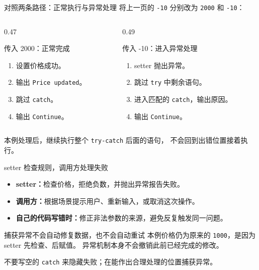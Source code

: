 \documentclass[aspectratio=169]{beamer}
\begin{document}
\begin{frame}{对照两条路径：正常执行与异常处理}
  将上一页的 \texttt{-10} 分别改为 \texttt{2000} 和 \texttt{-10}：
  \par\bigskip
  \begin{columns}[T,onlytextwidth]
    \begin{column}{0.47\textwidth}
      \begin{block}{传入 2000：正常完成}
        \begin{enumerate}
          \item 设置价格成功。
          \item 输出 \texttt{Price updated}。
          \item 跳过 \texttt{catch}。
          \item 输出 \texttt{Continue}。
        \end{enumerate}
      \end{block}
    \end{column}
    \begin{column}{0.49\textwidth}
      \begin{block}{传入 -10：进入异常处理}
        \begin{enumerate}
          \item setter 抛出异常。
          \item 跳过 \texttt{try} 中剩余语句。
          \item 进入匹配的 \texttt{catch}，输出原因。
          \item 输出 \texttt{Continue}。
        \end{enumerate}
      \end{block}
    \end{column}
  \end{columns}
  \bigskip
  本例处理后，继续执行整个 \texttt{try-catch} 后面的语句，
  \alert{不会回到出错位置接着执行}。
\end{frame}

\begin{frame}{setter 检查规则，调用方处理失败}
  \begin{itemize}
    \item \textbf{setter：}检查价格，拒绝负数，并抛出异常报告失败。
    \item \textbf{调用方：}根据场景提示用户、重新输入，或取消这次操作。
    \item \textbf{自己的代码写错时：}修正非法参数的来源，避免反复触发同一问题。
  \end{itemize}
  \bigskip
  \begin{block}{捕获异常不会自动修复数据，也不会自动重试}
    本例价格仍为原来的 \texttt{1000}，是因为 setter 先检查、后赋值。
    异常机制本身不会撤销此前已经完成的修改。
  \end{block}
  \medskip
  不要写空的 \texttt{catch} 来隐藏失败；在能作出合理处理的位置捕获异常。
\end{frame}
\end{document}
